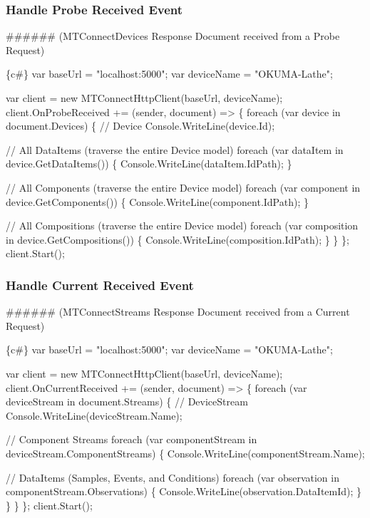 \subsubsection*{Handle Probe Received Event}

\#\#\#\#\#\# (M\+T\+Connect\+Devices Response Document received from a Probe Request) 
\begin{DoxyCode}
\{c#\}
var baseUrl = "localhost:5000";
var deviceName = "OKUMA-Lathe";

var client = new MTConnectHttpClient(baseUrl, deviceName);
client.OnProbeReceived += (sender, document) =>
\{
    foreach (var device in document.Devices)
    \{
        // Device
        Console.WriteLine(device.Id);

        // All DataItems (traverse the entire Device model)
        foreach (var dataItem in device.GetDataItems())
        \{
            Console.WriteLine(dataItem.IdPath);
        \}

        // All Components (traverse the entire Device model)
        foreach (var component in device.GetComponents())
        \{
            Console.WriteLine(component.IdPath);
        \}

        // All Compositions (traverse the entire Device model)
        foreach (var composition in device.GetCompositions())
        \{
            Console.WriteLine(composition.IdPath);
        \}
    \}
\};
client.Start();
\end{DoxyCode}


\subsubsection*{Handle Current Received Event}

\#\#\#\#\#\# (M\+T\+Connect\+Streams Response Document received from a Current Request) 
\begin{DoxyCode}
\{c#\}
var baseUrl = "localhost:5000";
var deviceName = "OKUMA-Lathe";

var client = new MTConnectHttpClient(baseUrl, deviceName);
client.OnCurrentReceived += (sender, document) =>
\{
    foreach (var deviceStream in document.Streams)
    \{
        // DeviceStream
        Console.WriteLine(deviceStream.Name);

        // Component Streams
        foreach (var componentStream in deviceStream.ComponentStreams)
        \{
            Console.WriteLine(componentStream.Name);

            // DataItems (Samples, Events, and Conditions)
            foreach (var observation in componentStream.Observations)
            \{
                Console.WriteLine(observation.DataItemId);
            \}
        \}
    \}
\};
client.Start();
\end{DoxyCode}


